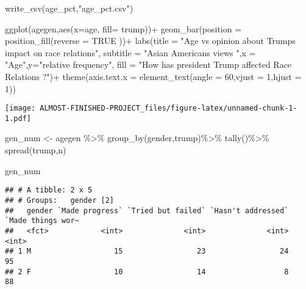 \documentclass[
]{article}
\newenvironment{Shaded}{\begin{snugshade}}{\end{snugshade}}
\newcommand{\AttributeTok}[1]{\textcolor[rgb]{0.77,0.63,0.00}{#1}}
\newcommand{\ConstantTok}[1]{\textcolor[rgb]{0.00,0.00,0.00}{#1}}
\newcommand{\DecValTok}[1]{\textcolor[rgb]{0.00,0.00,0.81}{#1}}
\newcommand{\FunctionTok}[1]{\textcolor[rgb]{0.00,0.00,0.00}{#1}}
\newcommand{\NormalTok}[1]{#1}
\newcommand{\OtherTok}[1]{\textcolor[rgb]{0.56,0.35,0.01}{#1}}
\newcommand{\SpecialCharTok}[1]{\textcolor[rgb]{0.00,0.00,0.00}{#1}}
\newcommand{\StringTok}[1]{\textcolor[rgb]{0.31,0.60,0.02}{#1}}
\begin{document}
\begin{Shaded}
\begin{Highlighting}[]
\FunctionTok{write\_csv}\NormalTok{(age\_pct,}\StringTok{"age\_pct.csv"}\NormalTok{)}

\FunctionTok{ggplot}\NormalTok{(agegen,}\FunctionTok{aes}\NormalTok{(}\AttributeTok{x=}\NormalTok{age, }\AttributeTok{fill=}\NormalTok{ trump))}\SpecialCharTok{+}
  \FunctionTok{geom\_bar}\NormalTok{(}\AttributeTok{position =} \FunctionTok{position\_fill}\NormalTok{(}\AttributeTok{reverse =} \ConstantTok{TRUE}\NormalTok{ ))}\SpecialCharTok{+} 
  \FunctionTok{labs}\NormalTok{(}\AttributeTok{title =} \StringTok{"Age vs opinion about Trump\textquotesingle{}s impact on race relations"}\NormalTok{,}
       \AttributeTok{subtitle =} \StringTok{"Asian Americans views "}\NormalTok{,}\AttributeTok{x =} \StringTok{"Age"}\NormalTok{,}\AttributeTok{y=}\StringTok{"relative frequency"}\NormalTok{, }
       \AttributeTok{fill =} \StringTok{"How has president Trump affected Race Relations ?"}\NormalTok{)}\SpecialCharTok{+}
  \FunctionTok{theme}\NormalTok{(}\AttributeTok{axis.text.x =} \FunctionTok{element\_text}\NormalTok{(}\AttributeTok{angle =} \DecValTok{60}\NormalTok{,}\AttributeTok{vjust =} \DecValTok{1}\NormalTok{,}\AttributeTok{hjust =} \DecValTok{1}\NormalTok{))}
\end{Highlighting}
\end{Shaded}

\texttt{[image: ALMOST-FINISHED-PROJECT\_files/figure-latex/unnamed-chunk-1-1.pdf]}

\begin{Shaded}
\begin{Highlighting}[]
\NormalTok{gen\_num }\OtherTok{\textless{}{-}}\NormalTok{ agegen }\SpecialCharTok{\%\textgreater{}\%}
  \FunctionTok{group\_by}\NormalTok{(gender,trump)}\SpecialCharTok{\%\textgreater{}\%}
  \FunctionTok{tally}\NormalTok{()}\SpecialCharTok{\%\textgreater{}\%}
  \FunctionTok{spread}\NormalTok{(trump,n)}

\NormalTok{gen\_num}
\end{Highlighting}
\end{Shaded}

\begin{verbatim}
## # A tibble: 2 x 5
## # Groups:   gender [2]
##   gender `Made progress` `Tried but failed` `Hasn't addressed` `Made things wor~
##   <fct>            <int>              <int>              <int>             <int>
## 1 M                   15                 23                 24                95
## 2 F                   10                 14                  8                88
\end{verbatim}
\end{document}
